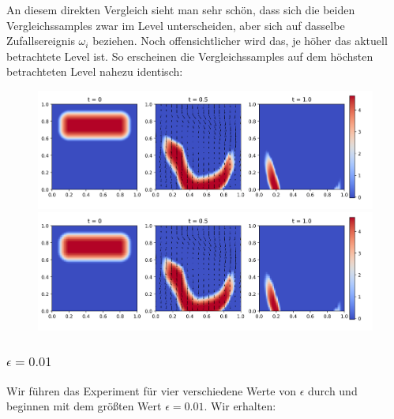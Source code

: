An diesem direkten Vergleich sieht man sehr schön, dass sich die beiden Vergleichssamples zwar im Level unterscheiden, aber sich auf dasselbe Zufallsereignis $ \omega_i $ beziehen. Noch offensichtlicher wird das, je höher das aktuell betrachtete Level ist.
So erscheinen die Vergleichssamples auf dem höchsten betrachteten Level nahezu identisch:
\begin{figure}[H]
	\centering
	\includegraphics[width=\textwidth]{plots/sample_7_0.png} 
	\includegraphics[width=\textwidth]{plots/sample_coarse_7_0.png} 
\end{figure}
\subsubsection{$ \epsilon=0.01 $}
Wir führen das Experiment für vier verschiedene Werte von $ \epsilon $ durch und beginnen mit dem größten Wert $ \epsilon=0.01 $. Wir erhalten: 


